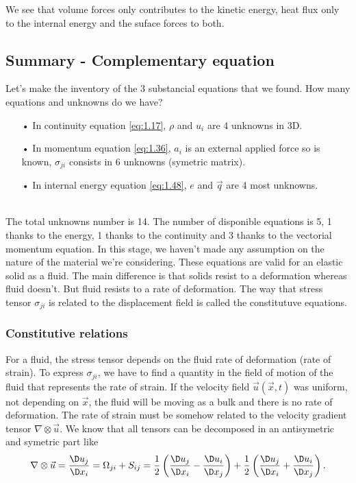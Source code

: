 		\begin{center}
		\end{center}
		We see that volume forces only contributes to the kinetic energy, heat flux only to the internal energy and the suface forces to both. 
		
	\subsection{Summary - Complementary equation}
		Let's make the inventory of the 3 substancial equations that we found. How many equations and unknowns do we have? 
	\begin{itemize}
		\item[•] In continuity equation \autoref{eq:1.17}, $\rho$ and $u_i$ are 4 unknowns in 3D. 
		\item[•] In momentum equation \autoref{eq:1.36}, $a_i$ is an external applied force so is known, $\sigma _{ji}$ consists in 6 unknowns (symetric matrix).
		\item[•] In internal energy equation \autoref{eq:1.48}, $e$ and $\vec{q}$ are 4 most unknowns. 
	\end{itemize}			
	\ \\
	The total unknowns number is 14.  The number of disponible equations is 5, 1 thanks to the energy, 1 thanks to the continuity and 3 thanks to the vectorial momentum equation. In this stage, we haven't made any assumption on the nature of the material we're considering. These equations are valid for an elastic solid as a fluid. The main difference is that solids resist to a deformation whereas fluid doesn't. But fluid resists to a rate of deformation. The way that stress tensor $\sigma _{ji}$ is related to the displacement field is called the constitutuve equations. 
	
	\subsubsection{Constitutive relations} 
		For a fluid, the stress tensor depends on the fluid rate of deformation (rate of strain). To express $\sigma _{ji}$, we have to find a quantity in the field of motion of the fluid that represents the rate of strain. If the velocity field $\vec{u}(\vec{x},t)$ was uniform, not depending on $\vec{x}$, the fluid will be moving as a bulk and there is no rate of deformation. The rate of strain must be somehow related to the velocity gradient tensor $\nabla \otimes \vec{u}$. We know that all tensors can be decomposed in an antisymetric and symetric part like 
		\begin{equation}
			\nabla \otimes \vec{u} = \frac{\D u_j}{\D x_i} = \Omega _{ji} + S _{ij} = \frac{1}{2} \left( \frac{\D u_j}{\D x_i} - \frac{\D u_i}{\D x_j} \right) + \frac{1}{2} \left( \frac{\D u_j}{\D x_i} + \frac{\D u_i}{\D x_j} \right).
		\end{equation}
		

